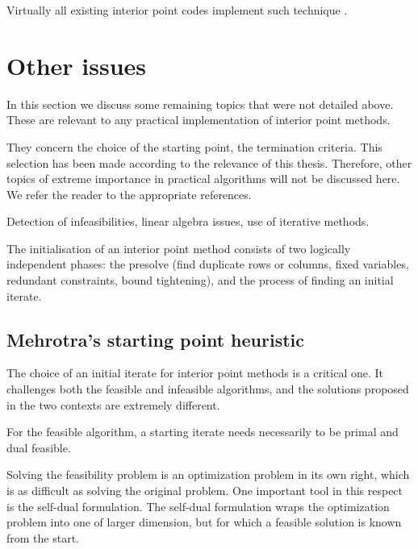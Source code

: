 Virtually all existing interior point codes implement such technique 
\cite[Appendix B]{ipm:Wright97}.

%
%
\section{Other issues}

In this section we discuss some remaining topics that were not
detailed above. These are relevant to any practical implementation
of interior point methods.

They concern the choice of the starting point, the termination
criteria. This selection has been made according to the relevance
of this thesis.
Therefore, other topics of extreme importance in practical algorithms
will not be discussed here. We refer the reader to the appropriate
references.

Detection of infeasibilities, linear algebra issues, use of iterative
methods.

\hrulefill

The initialisation of an interior point method consists of two
logically independent phases: the presolve (find duplicate rows or
columns, fixed variables, redundant constraints, bound tightening),
and the process of finding an initial iterate.

%
%
\subsection{Mehrotra's starting point heuristic}
\label{sec:StartingPoint}

The choice of an initial iterate for interior point methods is a
critical one. It challenges both the feasible and infeasible
algorithms, and the solutions proposed in the two contexts are
extremely different.

For the feasible algorithm, a starting iterate needs necessarily 
to be primal and dual feasible.

Solving the feasibility problem is an optimization problem in its
own right, which is as difficult as solving the original problem.
One important tool in this respect is the self-dual formulation.
The self-dual formulation wraps the optimization problem into one 
of larger dimension, but for which a feasible solution is known 
from the start.



